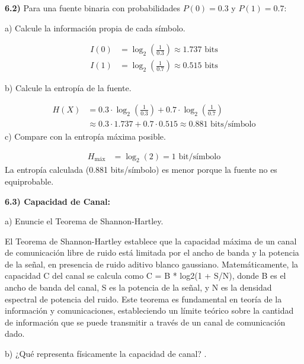 \noindent \textbf{6.2)} Para una fuente binaria con probabilidades \(P(0) = 0.3\) y \(P(1) = 0.7\):\par
\bigskip

\noindent a) Calcule la información propia de cada símbolo.\par
\begin{align*}
I(0) &= \log_2 \left( \frac{1}{0.3} \right) \approx 1.737 \text{ bits} \\
I(1) &= \log_2 \left( \frac{1}{0.7} \right) \approx 0.515 \text{ bits}
\end{align*}
\bigskip

\noindent b) Calcule la entropía de la fuente.\par
\begin{align*}
H(X) &= 0.3 \cdot \log_2 \left( \frac{1}{0.3} \right) + 0.7 \cdot \log_2 \left( \frac{1}{0.7} \right) \\
     &\approx 0.3 \cdot 1.737 + 0.7 \cdot 0.515 \approx 0.881 \text{ bits/símbolo}
\end{align*}
\noindent c) Compare con la entropía máxima posible. \par

\begin{align*}
H_{\text{máx}} &= \log_2(2) = 1 \text{ bit/símbolo}
\end{align*}
La entropía calculada (0.881 bits/símbolo) es menor porque la fuente no es equiprobable.


\bigskip

\noindent \textbf{6.3) Capacidad de Canal:}\par 
\bigskip

\noindent a) Enuncie el Teorema de Shannon-Hartley. \par
\bigskip

El Teorema de Shannon-Hartley establece que la capacidad máxima de un canal de comunicación libre de ruido está limitada por el ancho de banda y la potencia de la señal, en presencia de ruido aditivo blanco gaussiano. Matemáticamente, la capacidad C del canal se calcula como C = B * log2(1 + S/N), donde B es el ancho de banda del canal, S es la potencia de la señal, y N es la densidad espectral de potencia del ruido. Este teorema es fundamental en teoría de la información y comunicaciones, estableciendo un límite teórico sobre la cantidad de información que se puede transmitir a través de un canal de comunicación dado.
\bigskip

\noindent b) ¿Qué representa físicamente la capacidad de canal? .\par

